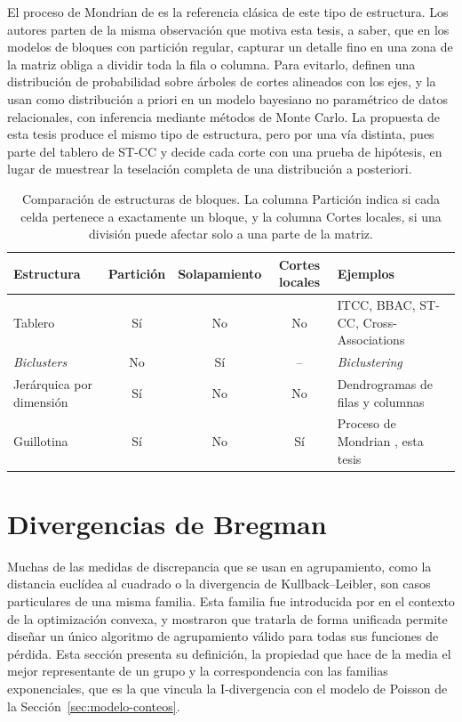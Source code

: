 El proceso de Mondrian de \citet{Roy2008} es la referencia clásica de este tipo de
estructura. Los autores parten de la misma observación que motiva esta tesis, a
saber, que en los modelos de bloques con partición regular, capturar un detalle
fino en una zona de la matriz obliga a dividir toda la fila o columna. Para evitarlo, definen
una distribución de probabilidad sobre árboles de cortes alineados con los ejes, y
la usan como distribución a priori en un modelo bayesiano no paramétrico de datos
relacionales, con inferencia mediante métodos de Monte Carlo. La propuesta de esta
tesis produce el mismo tipo de estructura, pero por una vía distinta, pues parte
del tablero de ST-CC y decide cada corte con una prueba de hipótesis, en lugar de
muestrear la teselación completa de una distribución a posteriori.

\begin{table}[ht]
  \centering
  {\footnotesize
  \renewcommand{\arraystretch}{1.4}
  \begin{tabular}{@{}l c c c >{\raggedright\arraybackslash}p{}@{}}
    \toprule
    \textbf{Estructura} & \textbf{Partición} & \textbf{Solapamiento} &
    \textbf{Cortes locales} & \textbf{Ejemplos} \\
    \midrule
    Tablero & Sí & No & No & ITCC, BBAC, ST-CC, Cross-Associations \\
    \midrule
    \emph{Biclusters} & No & Sí & -- & \emph{Biclustering} \citep{Castanho2024} \\
    \midrule
    Jerárquica por dimensión & Sí & No & No & Dendrogramas de filas y columnas \\
    \midrule
    Guillotina & Sí & No & Sí & Proceso de Mondrian \citep{Roy2008}, esta tesis \\
    \bottomrule
  \end{tabular}
  }
  \caption{Comparación de estructuras de bloques. La columna Partición indica si
  cada celda pertenece a exactamente un bloque, y la columna Cortes locales, si
  una división puede afectar solo a una parte de la matriz.}
  \label{tab:estructuras}
\end{table}

\section{Divergencias de Bregman}\label{sec:bregman}

Muchas de las medidas de discrepancia que se usan en agrupamiento, como la
distancia euclídea al cuadrado o la divergencia de Kullback--Leibler, son casos
particulares de una misma familia. Esta familia fue introducida por
\citet{Bregman1967} en el contexto de la optimización convexa, y
\citet{Banerjee2005} mostraron que tratarla de forma unificada permite diseñar un
único algoritmo de agrupamiento válido para todas sus funciones de pérdida. Esta
sección presenta su definición, la propiedad que hace de la media el mejor
representante de un grupo y la correspondencia con las familias exponenciales,
que es la que vincula la I-divergencia con el modelo de Poisson de la
Sección~\ref{sec:modelo-conteos}.

